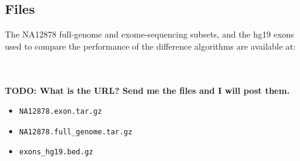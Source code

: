 \subsection{Files}

The NA12878 full-genome and exome-sequencing subsets, and the hg19 exons used to
compare the performance of the difference algorithms are available at:

\\
\\
\textbf{TODO: What is the URL?  Send me the files and I will post them.}
\\

\begin{itemize}
	\item {\tt NA12878.exon.tar.gz}
	\item {\tt NA12878.full\_genome.tar.gz}
	\item {\tt exons\_hg19.bed.gz}
\end{itemize}
